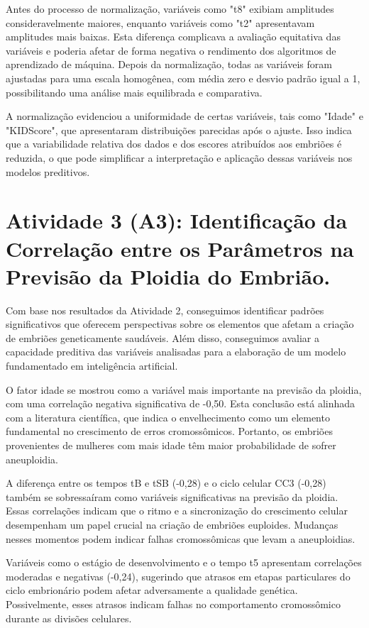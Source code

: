 Antes do processo de normalização, variáveis como "t8" exibiam amplitudes consideravelmente maiores, enquanto variáveis como "t2" apresentavam amplitudes mais baixas. Esta diferença complicava a avaliação equitativa das variáveis e poderia afetar de forma negativa o rendimento dos algoritmos de aprendizado de máquina. Depois da normalização, todas as variáveis foram ajustadas para uma escala homogênea, com média zero e desvio padrão igual a 1, possibilitando uma análise mais equilibrada e comparativa.

A normalização evidenciou a uniformidade de certas variáveis, tais como "Idade" e "KIDScore", que apresentaram distribuições parecidas após o ajuste. Isso indica que a variabilidade relativa dos dados e dos escores atribuídos aos embriões é reduzida, o que pode simplificar a interpretação e aplicação dessas variáveis nos modelos preditivos.

\section{Atividade 3 (A3): Identificação da Correlação entre os Parâmetros na Previsão da Ploidia do Embrião.}

Com base nos resultados da Atividade 2, conseguimos identificar padrões significativos que oferecem perspectivas sobre os elementos que afetam a criação de embriões geneticamente saudáveis. Além disso, conseguimos avaliar a capacidade preditiva das variáveis analisadas para a elaboração de um modelo fundamentado em inteligência artificial.

O fator idade se mostrou como a variável mais importante na previsão da ploidia, com uma correlação negativa significativa de -0,50. Esta conclusão está alinhada com a literatura científica, que indica o envelhecimento como um elemento fundamental no crescimento de erros cromossômicos. Portanto, os embriões provenientes de mulheres com mais idade têm maior probabilidade de sofrer aneuploidia.

A diferença entre os tempos tB e tSB (-0,28) e o ciclo celular CC3 (-0,28) também se sobressaíram como variáveis significativas na previsão da ploidia. Essas correlações indicam que o ritmo e a sincronização do crescimento celular desempenham um papel crucial na criação de embriões euploides. Mudanças nesses momentos podem indicar falhas cromossômicas que levam a aneuploidias.

Variáveis como o estágio de desenvolvimento e o tempo t5 apresentam correlações moderadas e negativas (-0,24), sugerindo que atrasos em etapas particulares do ciclo embrionário podem afetar adversamente a qualidade genética. Possivelmente, esses atrasos indicam falhas no comportamento cromossômico durante as divisões celulares.

